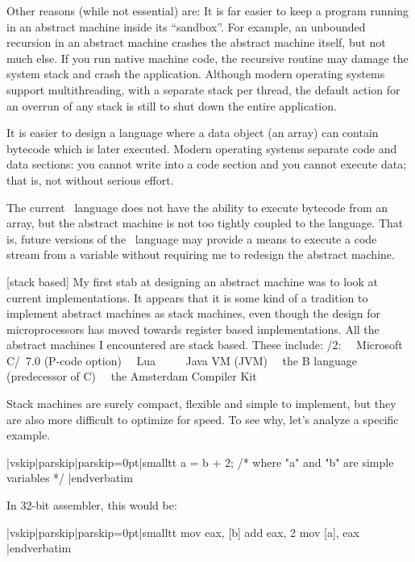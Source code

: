 Other reasons (while not essential) are:
\beginlist{1em}
\list{\lbullet} It is far easier to keep a program running in an abstract
  machine inside its ``sandbox''. For example, an unbounded recursion in an
  abstract machine crashes the abstract machine itself, but not much else. If
  you run native machine code, the recursive routine may damage the system
  stack and crash the application. Although modern operating systems support
  multithreading, with a separate stack per thread, the default action for an
  overrun of any stack is still to shut down the entire application.

\list{\lbullet} It is easier to design a language where a data object (an
  array) can contain bytecode which is later executed. Modern operating
  systems separate code and data sections: you cannot write into a code
  section and you cannot execute data; that is, not without serious effort.

  The current \Small\ language does not have the ability to execute bytecode
  from an array, but the abstract machine is not too tightly coupled to the
  language. That is, future versions of the \Small\ language may provide a means
  to execute a code stream from a variable without requiring me to redesign
  the abstract machine.
\endlist

[stack based]
My first stab at designing an abstract machine was to look at current
implementations. It appears that it is some kind of a tradition to implement
abstract machines as stack machines, even though the design for
microprocessors has moved towards register based implementations. All the
abstract machines I encountered are stack based. These include:
/2:
\lbullet\ \ Microsoft C/\Cpp\ 7.0 (P-code option)
\lbullet\ \ Lua 
\lbullet\ \  
\lbullet\ \ Java VM (JVM) 
\lbullet\ \ the B language (predecessor of C) 
\lbullet\ \ the Amsterdam Compiler Kit

Stack machines are surely compact, flexible and simple to implement, but they
are also more difficult to optimize for speed. To see why, let's analyze a
specific example.

\verbatim|vskip|parskip|parskip=0pt|smalltt
        a = b + 2;      /* where "a" and "b" are simple variables */
|endverbatim

In 32-bit assembler, this would be:

\verbatim|vskip|parskip|parskip=0pt|smalltt
        mov     eax, [b]
        add     eax, 2
        mov     [a], eax
|endverbatim

